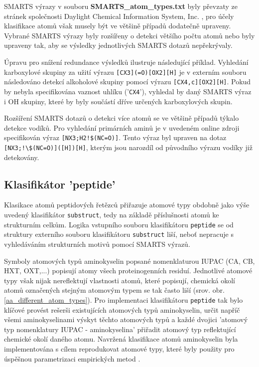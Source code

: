 SMARTS výrazy v souboru \textbf{SMARTS\_atom\_types.txt} byly převzaty ze stránek společnosti Daylight Chemical Information System, Inc. \cite{SMARTS_exm}, pro účely klasifikace atomů však musely být ve většině případů dodatečně upraveny. Vybrané SMARTS výrazy byly rozšířeny o detekci většího počtu atomů nebo byly upraveny tak, aby %
se výsledky jednotlivých SMARTS dotazů nepřekrývaly. 

Úpravu pro snížení redundance výsledků ilustruje následující příklad. Vyhledání karboxylové skupiny za užití výrazu \verb|[CX3](=O)[OX2][H]| je v externím souboru následováno detekcí alkoholové skupiny pomocí výrazu \verb|[CX4,c][OX2][H]|. Pokud by nebyla specifikována vaznost uhlíku ('\verb|CX4|'), vyhledal by daný SMARTS výraz i OH skupiny, které by byly součástí dříve určených karboxylových skupin. 

Rozšíření SMARTS dotazů o detekci více atomů se ve většině případů týkalo detekce vodíků. Pro vyhledání primárních aminů je v uvedeném online zdroji specifikován výraz \verb|[NX3;H2!$(NC=O)]|. Tento výraz byl upraven
na dotaz \verb|[NX3;!\$(NC=O)]([H])[H]|, kterým jsou narozdíl od původního výrazu vodíky již detekovány.
 
\subsection{Klasifikátor 'peptide'}
Klasikace atomů peptidových řetězců přiřazuje atomové typy obdobně jako výše uvedený klasifikátor \verb|substruct|, tedy na základě příslušnosti atomů ke strukturním celkům. Logika vstupního souboru klasifikátoru \verb|peptide| se od struktury externího souboru klasifikátoru \verb|substruct| liší, neboť nepracuje s vyhledáváním strukturních motivů pomocí SMARTS výrazů. 

Symboly atomových typů aminokyselin popsané nomenklaturou IUPAC (CA, CB, HXT, OXT,...) popisují atomy všech proteinogenních residuí. Jednotlivé atomové typy však nijak nereflektují vlastnosti atomů, které popisují, chemická okolí ato\-mů označených stejným atomovým typem se tak často liší (srov. obr. \ref{aa_different_atom_types}). Pro implementaci klasifikátoru \verb|peptide| tak bylo klíčové provést rešerši existujících atomových typů aminokyselin, určit napříč všemi aminokyselinami výskyt těchto atomových typů a každé dvojici 'atomový typ  nomenklatury IUPAC - aminokyselina' přiřadit atomový typ reflektující chemické okolí daného atomu. Navržená klasifikace atomů aminokyselin byla implementována s cílem reprodukovat atomové typy, které byly použity pro úspěšnou parametrizaci empirických metod \cite{GDAC, attyp_peptides}.

